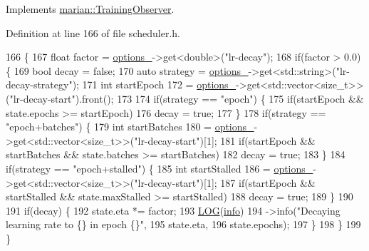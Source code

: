 Implements \hyperlink{classmarian_1_1TrainingObserver_a518893407fa20fc4b7ab892154de238d}{marian\+::\+Training\+Observer}.



Definition at line 166 of file scheduler.\+h.


\begin{DoxyCode}
166                                            \{
167     \textcolor{keywordtype}{float} factor = \hyperlink{classmarian_1_1Scheduler_a82aeb8a4ec08a364bec7c6aac6a25e01}{options\_}->get<\textcolor{keywordtype}{double}>(\textcolor{stringliteral}{"lr-decay"});
168     \textcolor{keywordflow}{if}(factor > 0.0) \{
169       \textcolor{keywordtype}{bool} decay = \textcolor{keyword}{false};
170       \textcolor{keyword}{auto} strategy = \hyperlink{classmarian_1_1Scheduler_a82aeb8a4ec08a364bec7c6aac6a25e01}{options\_}->get<std::string>(\textcolor{stringliteral}{"lr-decay-strategy"});
171       \textcolor{keywordtype}{int} startEpoch
172           = \hyperlink{classmarian_1_1Scheduler_a82aeb8a4ec08a364bec7c6aac6a25e01}{options\_}->get<std::vector<size\_t>>(\textcolor{stringliteral}{"lr-decay-start"}).front();
173 
174       \textcolor{keywordflow}{if}(strategy == \textcolor{stringliteral}{"epoch"}) \{
175         \textcolor{keywordflow}{if}(startEpoch && state.epochs >= startEpoch)
176           decay = \textcolor{keyword}{true};
177       \}
178       \textcolor{keywordflow}{if}(strategy == \textcolor{stringliteral}{"epoch+batches"}) \{
179         \textcolor{keywordtype}{int} startBatches
180             = \hyperlink{classmarian_1_1Scheduler_a82aeb8a4ec08a364bec7c6aac6a25e01}{options\_}->get<std::vector<size\_t>>(\textcolor{stringliteral}{"lr-decay-start"})[1];
181         \textcolor{keywordflow}{if}(startEpoch && startBatches && state.batches >= startBatches)
182           decay = \textcolor{keyword}{true};
183       \}
184       \textcolor{keywordflow}{if}(strategy == \textcolor{stringliteral}{"epoch+stalled"}) \{
185         \textcolor{keywordtype}{int} startStalled
186             = \hyperlink{classmarian_1_1Scheduler_a82aeb8a4ec08a364bec7c6aac6a25e01}{options\_}->get<std::vector<size\_t>>(\textcolor{stringliteral}{"lr-decay-start"})[1];
187         \textcolor{keywordflow}{if}(startEpoch && startStalled && state.maxStalled >= startStalled)
188           decay = \textcolor{keyword}{true};
189       \}
190 
191       \textcolor{keywordflow}{if}(decay) \{
192         state.eta *= factor;
193         \hyperlink{amun_2common_2logging_8h_a8cad147aca8c526d3c8a03ae14d5c87d}{LOG}(\hyperlink{namespacefix__hard_a31eedbb056537bc1bef47ad5e40eaa68}{info})
194             ->info(\textcolor{stringliteral}{"Decaying learning rate to \{\} in epoch \{\}"},
195                    state.eta,
196                    state.epochs);
197       \}
198     \}
199   \}
\end{DoxyCode}

